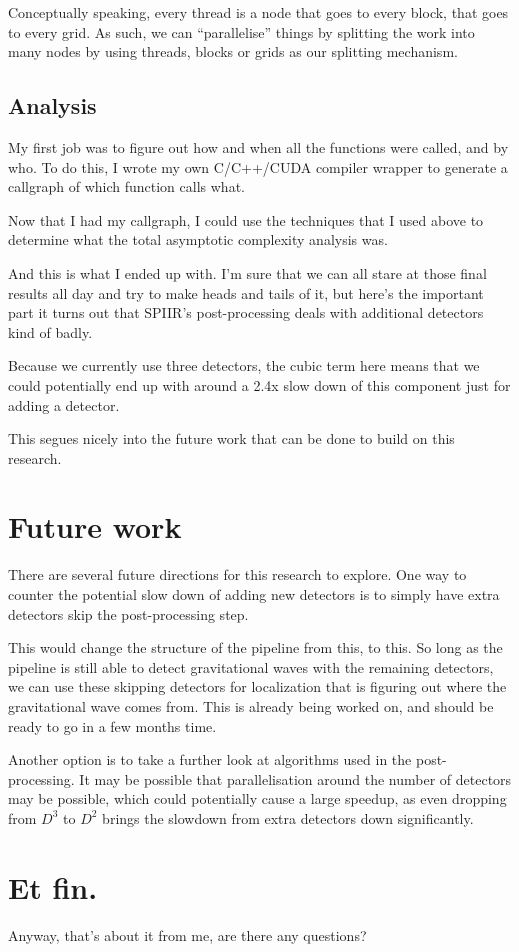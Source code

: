 \documentclass{article}
\begin{document}
Conceptually speaking, every thread is a node that goes to every block, that goes to every grid.
As such, we can ``parallelise'' things by splitting the work into many nodes by using threads, blocks or grids as our splitting mechanism.

\subsection{Analysis}

My first job was to figure out how and when all the functions were called, and by who.
To do this, I wrote my own C/C++/CUDA compiler wrapper to generate a callgraph of which function calls what.

Now that I had my callgraph, I could use the techniques that I used above to determine what the total asymptotic complexity analysis was.

And this is what I ended up with.
I'm sure that we can all stare at those final results all day and try to make heads and tails of it, but here's the important part \textemdash{} it turns out that SPIIR's post-processing deals with additional detectors kind of badly.

Because we currently use three detectors, the cubic term here means that we could potentially end up with around a 2.4x slow down of this component just for adding a detector.

This segues nicely into the future work that can be done to build on this research.

\section{Future work}

There are several future directions for this research to explore.
One way to counter the potential slow down of adding new detectors is to simply have extra detectors skip the post-processing step.

This would change the structure of the pipeline from this, to this.
So long as the pipeline is still able to detect gravitational waves with the remaining detectors, we can use these skipping detectors for localization \textemdash{} that is figuring out where the gravitational wave comes from.
This is already being worked on, and should be ready to go in a few months time.

Another option is to take a further look at algorithms used in the post-processing.
It may be possible that parallelisation around the number of detectors may be possible, which could potentially cause a large speedup, as even dropping from $D^3$ to $D^2$ brings the slowdown from extra detectors down significantly.

\section{Et fin.}

Anyway, that's about it from me, are there any questions?
\end{document}
